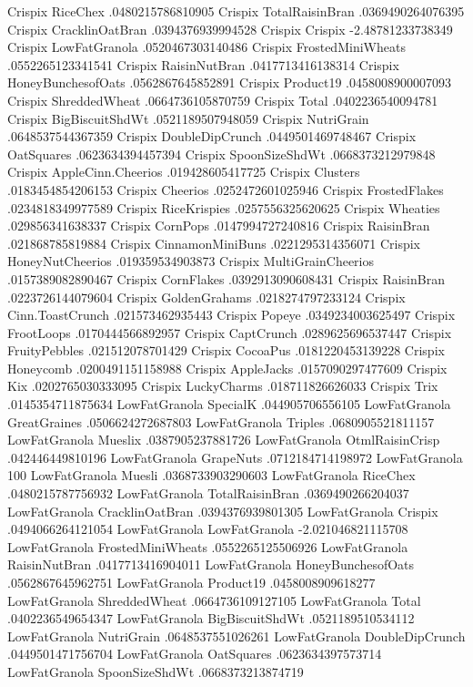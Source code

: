 Crispix	RiceChex	.0480215786810905
Crispix	TotalRaisinBran	.0369490264076395
Crispix	CracklinOatBran	.0394376939994528
Crispix	Crispix	-2.48781233738349
Crispix	LowFatGranola	.0520467303140486
Crispix	FrostedMiniWheats	.0552265123341541
Crispix	RaisinNutBran	.0417713416138314
Crispix	HoneyBunchesofOats	.0562867645852891
Crispix	Product19	.0458008900007093
Crispix	ShreddedWheat	.0664736105870759
Crispix	Total	.0402236540094781
Crispix	BigBiscuitShdWt	.0521189507948059
Crispix	NutriGrain	.0648537544367359
Crispix	DoubleDipCrunch	.0449501469748467
Crispix	OatSquares	.0623634394457394
Crispix	SpoonSizeShdWt	.0668373212979848
Crispix	AppleCinn.Cheerios	.019428605417725
Crispix	Clusters	.0183454854206153
Crispix	Cheerios	.0252472601025946
Crispix	FrostedFlakes	.0234818349977589
Crispix	RiceKrispies	.0257556325620625
Crispix	Wheaties	.029856341638337
Crispix	CornPops	.0147994727240816
Crispix	RaisinBran	.021868785819884
Crispix	CinnamonMiniBuns	.0221295314356071
Crispix	HoneyNutCheerios	.019359534903873
Crispix	MultiGrainCheerios	.0157389082890467
Crispix	CornFlakes	.0392913090608431
Crispix	RaisinBran	.0223726144079604
Crispix	GoldenGrahams	.0218274797233124
Crispix	Cinn.ToastCrunch	.021573462935443
Crispix	Popeye	.0349234003625497
Crispix	FrootLoops	.0170444566892957
Crispix	CaptCrunch	.0289625696537447
Crispix	FruityPebbles	.021512078701429
Crispix	CocoaPus	.0181220453139228
Crispix	Honeycomb	.0200491151158988
Crispix	AppleJacks	.0157090297477609
Crispix	Kix	.0202765030333095
Crispix	LuckyCharms	.018711826626033
Crispix	Trix	.0145354711875634
LowFatGranola	SpecialK	.044905706556105
LowFatGranola	GreatGraines	.0506624272687803
LowFatGranola	Triples	.0680905521811157
LowFatGranola	Mueslix	.0387905237881726
LowFatGranola	OtmlRaisinCrisp	.042446449810196
LowFatGranola	GrapeNuts	.0712184714198972
LowFatGranola	100%
LowFatGranola	Muesli	.0368733903290603
LowFatGranola	RiceChex	.0480215787756932
LowFatGranola	TotalRaisinBran	.0369490266204037
LowFatGranola	CracklinOatBran	.0394376939801305
LowFatGranola	Crispix	.0494066264121054
LowFatGranola	LowFatGranola	-2.021046821115708
LowFatGranola	FrostedMiniWheats	.0552265125506926
LowFatGranola	RaisinNutBran	.0417713416904011
LowFatGranola	HoneyBunchesofOats	.0562867645962751
LowFatGranola	Product19	.0458008909618277
LowFatGranola	ShreddedWheat	.0664736109127105
LowFatGranola	Total	.0402236549654347
LowFatGranola	BigBiscuitShdWt	.0521189510534112
LowFatGranola	NutriGrain	.0648537551026261
LowFatGranola	DoubleDipCrunch	.0449501471756704
LowFatGranola	OatSquares	.0623634397573714
LowFatGranola	SpoonSizeShdWt	.0668373213874719
